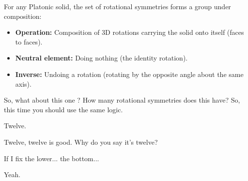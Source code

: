 \begin{content}
For any Platonic solid, the set of rotational symmetries forms a group under composition:
\begin{itemize}
    \item \textbf{Operation:} Composition of $3\text{D}$ rotations carrying the solid onto itself (faces to faces).
    \item \textbf{Neutral element:} Doing nothing (the identity rotation).
    \item \textbf{Inverse:} Undoing a rotation (rotating by the opposite angle about the same axis).
\end{itemize}

\end{content}

\begin{speech}[00:35:30 - 00:35:45]
So, what about this one ? How many rotational symmetries does this have? So, this time you should use the same logic.
\end{speech}

\begin{student}
Twelve.
\end{student}

\begin{speech}[00:35:47 - 00:35:50]
Twelve, twelve is good. Why do you say it's twelve?
\end{speech}

\begin{student}
If I fix the lower... the bottom...
\end{student}

\begin{speech}[00:35:53 - 00:35:54]
Yeah.
\end{speech}

